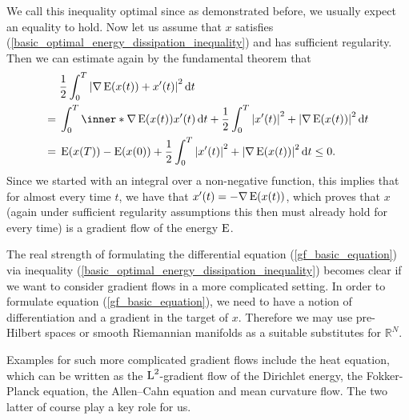 We call this inequality optimal since as demonstrated before, we usually expect an equality to hold.
Now let us assume that $ x $ satisfies (\ref{basic_optimal_energy_dissipation_inequality}) and has sufficient regularity.
Then we can estimate again by the fundamental theorem that
\begin{align*}
	& \frac{ 1 }{ 2 }
	\int_{ 0 }^{ T }
		\abs{
			\nabla \energy ( x ( t ) )
			+
			x' ( t ) 
		}^{ 2 }
	\dd{ t }
	\\
	={} &
	\int_{ 0 }^{ T }
		\inner*{ \nabla \energy ( x ( t ) ) }{ x' ( t ) }
	\dd{ t }
	+
	\frac{ 1 }{ 2 }
	\int_{ 0 }^{ T }
		\abs{ x' ( t ) }^{ 2 }
		+
		\abs{ \nabla \energy ( x ( t ) ) }^{ 2 }
	\dd{ t }
	\\
	={} &
	\energy ( x ( T ) ) - \energy ( x ( 0 ) ) 
	+
	\frac{ 1 }{ 2 }
	\int_{ 0 }^{ T }
		\abs{ x' ( t ) }^{ 2 }
		+
		\abs{ \nabla \energy ( x ( t ) ) }^{ 2 }
	\dd{ t }
	\leq 0.
\end{align*}
Since we started with an integral over a non-negative function, this implies 
that for almost every time $ t $, we have that $ x' ( t ) = - \nabla \operatorname{E} ( 
x ( t ) ) $, which proves that $ x $ (again under sufficient regularity 
assumptions this then must already hold for every time) is a gradient flow of 
the energy $ \operatorname{E} $.

The real strength of formulating the differential equation 
(\ref{gf_basic_equation}) via inequality 
(\ref{basic_optimal_energy_dissipation_inequality}) becomes clear if we want to 
consider gradient flows in a more complicated setting. In order to formulate 
equation (\ref{gf_basic_equation}), we need to have a notion of differentiation 
and a gradient in the target of $ x $. Therefore we may use pre-Hilbert spaces 
or smooth Riemannian manifolds as a suitable substitutes for $ \mathbb{ R }^{ N 
} $. 

Examples for such more complicated gradient flows include the heat equation, 
which can be written as the $ \operatorname{L}^{ 2 } $-gradient flow of the Dirichlet 
energy, 
the Fokker-Planck equation, the Allen--Cahn equation and mean curvature flow. 
The two latter of course play a key role for us.
\begin{comment}
A first example for a generalization is therefore the heat equation $ \partial_{ t } u - \Delta u = 0 $ for some open and bounded set $ \Omega $. As our space, we shall take $ \mathrm{ H }_{ 0 }^{ 1 } ( \Omega ) $ equipped with the inner product
\begin{equation*}
	\inner*{ u }{ v }
	\coloneqq
	\int
		\inner*{ u }{ v }
	\dd{ x }.
\end{equation*}
Our energy is given by the Dirichlet functional
\begin{equation*}
	\energy ( u ) \coloneqq
	\frac{ 1 }{ 2 }
	\int
		\abs{ \nabla u }^{ 2 }
	\dd{ x }
\end{equation*}
Then we can compute that at least on $ \mathrm{ H }_{ 0 }^{ 1 } \cap \mathrm{ H }^{ 2 } ( \Omega ) $, the Fréchet derivative of $ \energy $ is given by $ \diff ( E ) ( u ) [ v ] = - \int \Delta u v \dd{ x } $.
\end{comment}

